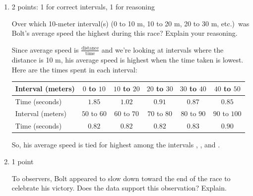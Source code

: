 \documentclass{article}
\begin{document}
\begin{enumerate}
\begin{enumerate}
  \item

    \begin{grading}
      2 points: 1 for correct intervals, 1 for reasoning
    \end{grading}

    \begin{problem}[\nstretch{4}]
      Over which 10-meter interval(s) (0 to 10 m, 10 to 20 m, 20 to 30 m, etc.)\ was Bolt's average speed the highest during this race? Explain your reasoning.
    \end{problem}

    \begin{solution} %
      Since average speed is $\frac{\text{distance}}{\text{time}}$ and we're looking at intervals where the distance is 10 m, his average speed is highest when the time taken is lowest. Here are the times spent in each interval:
      \begin{center}
        \begin{tabular}{l*{5}{c}}
          \hline
          Interval (meters) & $0$ to $10$ &  $10$ to $20$ &  $20$ to $30$ &  $30$ to $40$ &  $40$ to $50$ \\
          \hline
          Time (seconds) & $1.85$ & $1.02$ &  $0.91$ & $0.87$ &  $0.85$ \\
          \hline \hline
          Interval (meters) & $50$ to $60$ &  $60$ to $70$ &  $70$ to $80$ &  $80$ to $90$ &  $90$ to $100$ \\
          \hline
          Time (seconds) & $0.82$ & $0.82$ & $0.82$ & $0.83$ & $0.90$ \\
          \hline
        \end{tabular}
      \end{center}
      So, his average speed is tied for highest among the intervals , , and .
    \end{solution}

  \item
    \begin{grading}
      1 point
    \end{grading}

    \begin{problem}[\vfill]
      To observers, Bolt appeared to slow down toward the end of the race
      to celebrate his victory.  Does the data support this observation?
      Explain. 
    \end{problem}


\end{enumerate}
\end{enumerate}
\end{document}
